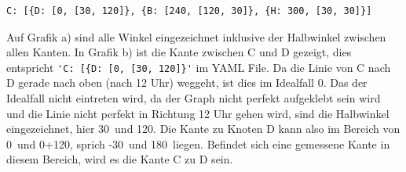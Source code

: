 \begin{verbatim}
C: [{D: [0, [30, 120]}, {B: [240, [120, 30]}, {H: 300, [30, 30]}]
\end{verbatim}

Auf Grafik a) sind alle Winkel eingezeichnet inklusive der Halbwinkel zwischen allen Kanten. In Grafik b) ist die Kante zwischen C und D gezeigt, dies entspricht \verb|'C: [{D: [0, [30, 120]}'| im YAML File. Da die Linie von C nach D gerade nach oben (nach 12 Uhr) weggeht, ist dies im Idealfall 0\textdegree.
Das der Idealfall nicht eintreten wird, da der Graph nicht perfekt aufgeklebt sein wird und die Linie nicht perfekt in Richtung 12 Uhr gehen wird, sind die Halbwinkel eingezeichnet, hier 30\textdegree\ und 120\textdegree. Die Kante zu Knoten D kann also im Bereich von 0\textdegree\ und 0\textdegree+120\textdegree, sprich -30\textdegree\ und 180\textdegree\ liegen. Befindet sich eine gemessene Kante in diesem Bereich, wird es die Kante C zu D sein.

